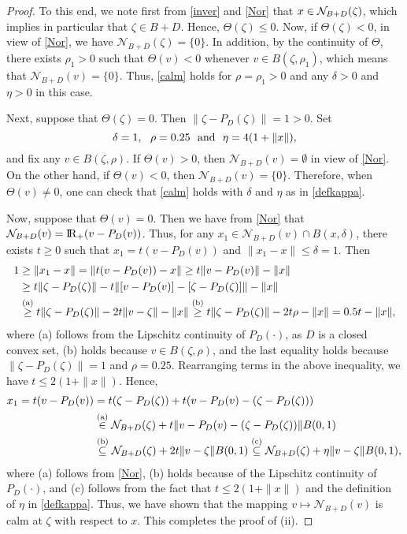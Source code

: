 \documentclass[10pt]{article}
\numberwithin{equation}{section}
\def\R{{\rm I\!R}}
\begin{document}
\begin{proof}
To this end, we note first from \eqref{inver} and \eqref{Nor} that $x\in{\cal N}_{B+D}(\zeta)$, which implies in particular that $\zeta \in B+D$. Hence, $\Theta(\zeta)\leq 0$.
Now, if $\Theta(\zeta) < 0$, in view of \eqref{Nor}, we have $\mathcal{N}_{B + D}(\zeta) = \{0\}$. In addition, by the continuity of $\Theta$, there exists $\rho_1 > 0$ such that $\Theta(v) < 0$ whenever $v\in B(\zeta, \rho_1)$, which means that $\mathcal{N}_{B + D}(v) = \{0\}$. Thus, \eqref{calm} holds for $\rho = \rho_1 > 0$ and any $\delta>0$ and $\eta>0$ in this case.

Next, suppose that $\Theta(\zeta) = 0$. Then $\|\zeta - P_D(\zeta)\| = 1 > 0$. Set
\begin{equation}\label{defkappa}
\delta = 1,\ \ \rho = 0.25\ \ {\rm and}\ \ \eta = 4(1 + \|x\|),
\end{equation}
and fix any $v\in B(\zeta, \rho)$. If $\Theta(v)>0$, then $\mathcal{N}_{B + D}(v) = \emptyset$ in view of \eqref{Nor}. On the other hand, if $\Theta(v)<0$, then $\mathcal{N}_{B + D}(v) = \{0\}$. Therefore, when $\Theta(v) \not= 0$, one can check that \eqref{calm} holds with $\delta$ and $\eta$ as in \eqref{defkappa}.

Now, suppose that $\Theta(v) = 0$. Then we have from \eqref{Nor} that $\mathcal{N}_{B + D}(v) = \R_+(v - P_D(v))$. Thus, for any $x_1\in \mathcal{N}_{B + D}(v)\cap B(x, \delta)$, there exists $t\geq 0$ such that $x_1 = t(v - P_D(v))$ and $\|x_1 - x\|\leq \delta = 1$. Then
\[
\begin{aligned}
1&\geq\|x_1 - x\| = \|t(v - P_D(v)) - x\|\geq t\|v - P_D(v)\| - \|x\|\\
& \ge t\|\zeta - P_D(\zeta)\| - t\|[v - P_D(v)] - [\zeta - P_D(\zeta)]\| - \|x\|\\
& \overset{\rm (a)}\ge t\|\zeta - P_D(\zeta)\| - 2t\|v - \zeta\| - \|x\|\overset{\rm (b)}\ge t\|\zeta - P_D(\zeta)\| - 2t\rho - \|x\| = 0.5 t - \|x\|,
\end{aligned}
\]
where (a) follows from the Lipschitz continuity of $P_D(\cdot)$, as $D$ is a closed convex set, (b) holds because $v \in B(\zeta, \rho)$, and the last equality holds because $\|\zeta - P_D(\zeta)\|= 1$ and $\rho = 0.25$. Rearranging terms in the above inequality, we have $t \leq 2(1 + \|x\|)$. Hence,
\[
\begin{aligned}
x_1 = t(v - P_D(v)) &= t(\zeta - P_D(\zeta)) + t(v - P_D(v) - (\zeta - P_D(\zeta)))\\
&\overset{\rm (a)}\in \mathcal{N}_{B + D}(\zeta) + t\|v - P_D(v) - (\zeta - P_D(\zeta))\|B(0,1)\\
&\overset{\rm (b)}\subseteq \mathcal{N}_{B + D}(\zeta) + 2t\|v - \zeta\|B(0,1)\overset{\rm (c)}\subseteq \mathcal{N}_{B + D}(\zeta) + \eta\|v - \zeta\|B(0,1),
\end{aligned}
\]
where (a) follows from \eqref{Nor}, (b) holds because of the Lipschitz continuity of $P_D(\cdot)$, and (c) follows from the fact that $t\le 2(1 + \|x\|)$ and the definition of $\eta$ in \eqref{defkappa}. Thus, we have shown that the mapping $v\mapsto \mathcal{N}_{B + D}(v)$ is calm at $\zeta$ with respect to $x$. This completes the proof of (ii).


\end{proof}
\end{document}
